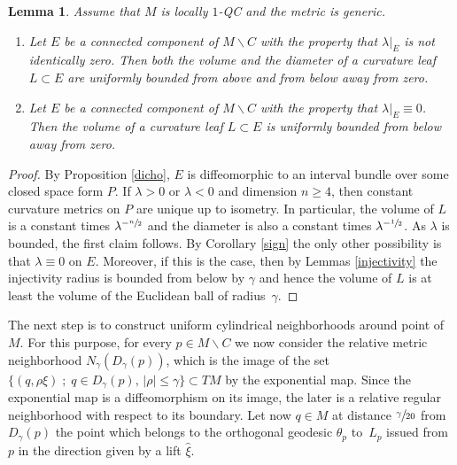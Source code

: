 \documentclass[JEP,XML,SOM,Unicode]{cedram}
\let\moins\smallsetminus
\newcommand{\sep}{\;;\;}
\newtheorem{lemma}[theorem]{Lemma}
\theoremstyle{definition}
\theoremstyle{remark}
\numberwithin{equation}{section}
\begin{document}
\begin{lemma}\label{bdvolume}
Assume that $M$ is locally $1$-QC and the metric is generic.
\begin{enumerate}
\item Let $E$ be a connected component of $M\moins C$ with the property that $\lambda|_E$ is not identically zero.
Then both the volume and the diameter of a curvature leaf $L\subset E$ are uniformly bounded
from above and from below away from zero.
\item Let $E$ be a connected component of $M\moins C$ with the property that $\lambda|_E\equiv 0$. Then
the volume of a curvature leaf $L\subset E$ is uniformly bounded from below away from zero.
\end{enumerate}
\end{lemma}
\begin{proof}
By Proposition \ref{dicho}, $E$ is diffeomorphic to an interval bundle over some closed space form $P$.
If $\lambda >0$ or $\lambda <0$ and dimension $n\geq4$, then constant curvature metrics on $P$ are unique up to
isometry. In particular, the volume of $L$ is a constant times $\lambda^{-\sfrac{n}{2}}$ and the diameter
is also a constant times $\lambda^{-\sfrac{1}{2}}$. As $\lambda$ is bounded, the first claim follows.
By Corollary \ref{sign} the only other possibility is that $\lambda\equiv 0$ on $E$.
Moreover, if this is the case, then by Lemmas \ref{injectivity} the injectivity radius is bounded from below by $\gamma$ and hence
the volume of $L$ is at least the volume of the Euclidean ball of radius~$\gamma$.
\end{proof}

The next step is to construct uniform cylindrical neighborhoods around point of~$M$.
For this purpose, for every $p\in M\moins C$ we now consider the relative metric neighborhood $N_{\gamma}(D_{\gamma}(p))$, which is the image of the set $\{(q, \rho\xi)\sep q\in D_{\gamma}(p),\, |\rho| \leq \gamma\}\subset TM$ by
the exponential map. Since the exponential map is a diffeomorphism on its image, the later is a
relative regular neighborhood with respect to its boundary.
Let now $q\in M$ at distance $\sfrac{\gamma}{20}$ from $D_{\gamma}(p)$ the point which belongs to the
orthogonal geodesic $\theta_p$ to~$L_p$ issued from $p$ in the direction given by a lift $\widehat{\xi}$.
\end{document}

